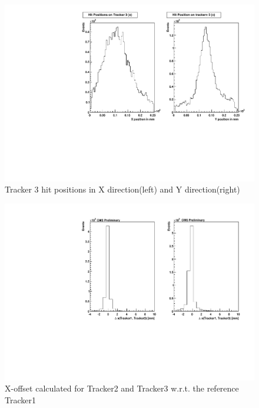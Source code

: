 \begin{figure}[!htbp]
\centering
\includegraphics[width=5.1in]{figures/GEM/Tracker3_Hit_position_Run1897.pdf}
\caption{Tracker 3 hit positions in X direction(left) and Y direction(right)}\label{fig:t3hit}
\end{figure}


\begin{figure}[!htbp]
\centering
\includegraphics[width=5.1in]{figures/GEM/Offset_1vs23_x_For_Run1897.pdf}
\caption{X-offset calculated for Tracker2 and Tracker3 w.r.t. the reference Tracker1}\label{fig:Xoff}
\end{figure}


